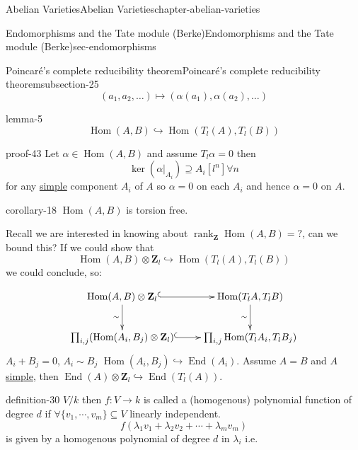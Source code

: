 \documentclass[oneside,10pt,]{book}
\numberwithin{equation}{section}
\newcommand{\ZZ}{\mathbf{Z}}
\DeclareMathOperator{\End}{End}
\DeclareMathOperator{\Hom}{Hom}
\DeclareMathOperator{\rank}{rank}
\begin{document}
\begin{chapterptx}{Abelian Varieties}{}{Abelian Varieties}{}{}{chapter-abelian-varieties}
\begin{sectionptx}{Endomorphisms and the Tate module (Berke)}{}{Endomorphisms and the Tate module (Berke)}{}{}{sec-endomorphisms}
\begin{subsectionptx}{Poincaré's complete reducibility theorem}{}{Poincaré's complete reducibility theorem}{}{}{subsection-25}
\begin{equation*}
(a_1,a_2, \ldots) \mapsto(\alpha(a_1),\alpha(a_2), \ldots)
\end{equation*}
%
\begin{lemma}{}{}{lemma-5}%
\hypertarget{p-229}{}%
%
\begin{equation*}
\Hom(A,B) \hookrightarrow \Hom(T_l(A), T_l(B))
\end{equation*}
%
\end{lemma}
\begin{proofptx}{}{proof-43}
\hypertarget{p-230}{}%
Let \(\alpha \in \Hom(A,B)\) and assume \(T_l \alpha = 0\) then%
\begin{equation*}
\ker (\alpha|_{A_i}) \supseteq A_i[l^n] \forall n
\end{equation*}
for any \hyperref[def-simple-av]{simple} component \(A_i\) of \(A\) so \(\alpha =0\) on each \(A_i\) and hence \(\alpha = 0\) on \(A\).%
\end{proofptx}
\begin{corollary}{}{}{corollary-18}%
\hypertarget{p-231}{}%
\(\Hom(A,B)\) is torsion free.%
\end{corollary}
\hypertarget{p-232}{}%
Recall we are interested in knowing about \(\rank_\ZZ\Hom(A,B) = ?\), can we bound this? If we could show that%
\begin{equation*}
\Hom(A,B) \otimes \ZZ_l \hookrightarrow \Hom(T_l(A),T_l(B))
\end{equation*}
we could conclude, so:%
\par
\hypertarget{p-233}{}%
%
\begin{equation*}
\xymatrix{
\Hom(A,B)\otimes \ZZ_l \ar[d]_{\sim} \ar@{^(->}[r]     & \Hom(T_lA,T_lB)\ar[d]_{\sim} \\
\prod_{i,j} (\Hom(A_i, B_j) \otimes \ZZ_l) \ar@{^(->}[r] & \prod_{i,j}\Hom(T_lA_i, T_l B_j)
}
\end{equation*}
\(A_i + B_j = 0\), \(A_i\sim B_j\) \(\Hom(A_i, B_j) \hookrightarrow \End(A_i)\). Assume \(A= B\) and \(A\) \hyperref[def-simple-av]{simple}, then \(\End(A) \otimes \ZZ_l \hookrightarrow \End(T_l(A))\).%
\begin{definition}{}{definition-30}%
\hypertarget{p-234}{}%
\(V/k\) then \(f\colon V \to k\) is called a (homogenous) polynomial function of degree \(d\) if \(\forall \{v_1,\cdots, v_m\}\subseteq V\) linearly independent.%
\begin{equation*}
f(\lambda_1 v_1 + \lambda_2 v_2 +\cdots + \lambda_m v_m)
\end{equation*}
is given by a homogenous polynomial of degree \(d\) in \(\lambda_i\) i.e.%

\end{definition}
\end{subsectionptx}
\end{sectionptx}
\end{chapterptx}
\end{document}
